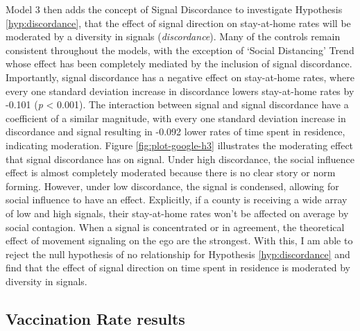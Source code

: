 Model 3 then adds the concept of Signal Discordance to investigate Hypothesis
\ref{hyp:discordance}, that the effect of signal direction on stay-at-home rates
will be moderated by a diversity in signals (\emph{discordance}). Many of the
controls remain consistent throughout the models, with the exception of `Social
Distancing' Trend whose effect has been completely mediated by the inclusion of
signal discordance. Importantly, signal discordance has a negative effect on
stay-at-home rates, where every one standard deviation increase in discordance
lowers stay-at-home rates by -0.101 (\emph{p} \textless{} 0.001). The
interaction between signal and signal discordance have a coefficient of a
similar magnitude, with every one standard deviation increase in discordance and
signal resulting in -0.092 lower rates of time spent in residence, indicating
moderation. Figure \ref{fig:plot-google-h3} illustrates the moderating effect
that signal discordance has on signal. Under high discordance, the social
influence effect is almost completely moderated because there is no clear story
or norm forming. However, under low discordance, the signal is condensed,
allowing for social influence to have an effect. Explicitly, if a county is
receiving a wide array of low and high signals, their stay-at-home rates won't
be affected on average by social contagion. When a signal is concentrated or in agreement,
the theoretical effect of movement signaling on the ego are the strongest. With
this, I am able to reject the null hypothesis of no relationship for Hypothesis
\ref{hyp:discordance} and find that the effect of signal direction on time spent
in residence is moderated by diversity in signals.

\hypertarget{vaccination-rate-results}{\subsection{Vaccination Rate results}\label{vaccination-rate-results}}



